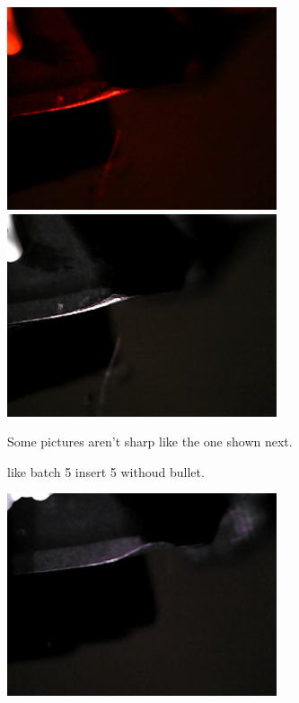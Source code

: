 \documentclass{article}
\begin{document}
\includegraphics[width=3.125000in, keepaspectratio=true]{./ZimFiles_files/Vision/Dataset/automated_datasets/2_created_datasets/2_Spaghetti_dataset/b_003_p_006_l_006-011_red_nb.png}\includegraphics[width=3.125000in, keepaspectratio=true]{./ZimFiles_files/Vision/Dataset/automated_datasets/2_created_datasets/2_Spaghetti_dataset/b_003_p_006_l_006-011_white_nb.png}



Some pictures aren't sharp like the one shown next.

like batch 5 insert 5 withoud bullet.

\includegraphics[width=3.125000in, keepaspectratio=true]{./ZimFiles_files/Vision/Dataset/automated_datasets/2_created_datasets/2_Spaghetti_dataset/b_005_p_005_l_006-011_white_nb.png}
\end{document}
